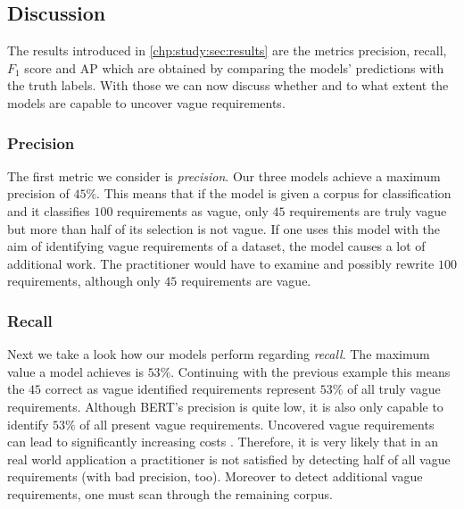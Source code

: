 \subsection{Discussion}
\label{chp:study:sec:interpretation:subsec:discussion}

The results introduced in \cref{chp:study:sec:results} are the metrics precision, recall, $F_1$ score and \ac{AP} which are obtained by comparing the models' predictions with the truth labels.
With those we can now discuss whether and to what extent the models are capable to uncover vague requirements.

\subsubsection{Precision}
\label{chp:study:sec:interpretation:subsec:discussion:precision}
The first metric we consider is \textit{precision}.
Our three models achieve a maximum precision of $45\%$.
This means that if the model is given a corpus for classification and it classifies $100$ requirements as vague, only $45$ requirements are truly vague but more than half of its selection is not vague.
If one uses this model with the aim of identifying vague requirements of a dataset, the model causes a lot of additional work.
The practitioner would have to examine and possibly rewrite $100$ requirements, although only $45$ requirements are vague.

\subsubsection{Recall}
\label{chp:study:sec:interpretation:subsec:discussion:recall}
Next we take a look how our models perform regarding \textit{recall}.
The maximum value a model achieves is $53\%$.
Continuing with the previous example this means the $45$ correct as vague identified requirements represent $53\%$ of all truly vague requirements.
Although \ac{BERT}'s precision is quite low, it is also only capable to identify $53\%$ of all present vague requirements.
Uncovered vague requirements can lead to significantly increasing costs \parencite{Femmer:2017}.
Therefore, it is very likely that in an real world application a practitioner is not satisfied by detecting half of all vague requirements (with bad precision, too).
Moreover to detect additional vague requirements, one must scan through the remaining corpus.

